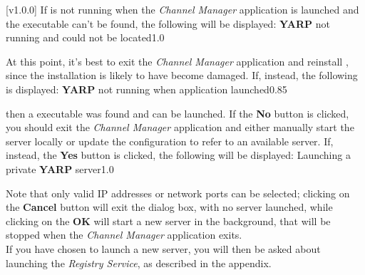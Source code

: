 [v1.0.0]
If \yarp{} is not running when the \emph{Channel Manager} application is launched and the
\yarp{} executable can't be found, the following will be displayed:
%
{\textbf{YARP} not running and could not be located}{1.0}

At this point, it's best to exit the \emph{Channel Manager} application and reinstall
\mplusm, since the installation is likely to have become damaged.
If, instead, the following is displayed:
%
{\textbf{YARP} not running when application launched}{0.85}

then a \yarp{} executable was found and can be launched.
If the \textbf{No} button is clicked, you should exit the \emph{Channel Manager}
application and either manually start the \yarp{} server locally or update the \yarp{}
configuration to refer to an available \yarp{} server.
\condPage{}
If, instead, the \textbf{Yes} button is clicked, the following will be displayed:
%
{Launching a private \textbf{YARP} server}{1.0}

Note that only valid IP addresses or network ports can be selected; clicking on the
\textbf{Cancel} button will exit the dialog box, with no \yarp{} server launched, while
clicking on the \textbf{OK} will start a new \yarp{} server in the background, that will
be stopped when the \emph{Channel Manager} application exits.\\

If you have chosen to launch a new \yarp{} server, you will then be asked about launching
the \emph{Registry Service}, as described in the
 appendix.
\appendixEnd{}
